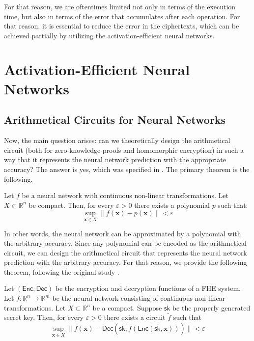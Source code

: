 \documentclass{iacrtrans}
\begin{document}
For that reason, we are oftentimes limited not only in terms of the execution
time, but also in terms of the error that accumulates after each operation. For
that reason, it is essential to reduce the error in the ciphertexts, which can
be achieved partially by utilizing the activation-efficient neural networks.

\section{Activation-Efficient Neural Networks}

\subsection{Arithmetical Circuits for Neural Networks}

Now, the main question arises: can we theoretically design the arithmetical 
circuit (both for zero-knowledge proofs and homomorphic encryption) in such a
way that it represents the neural network prediction with the appropriate 
accuracy? The answer is yes, which was specified in \cite{cryptonets}. 
The primary theorem is the following.

\begin{theorem}
    Let $f$ be a neural network with continuous non-linear transformations. Let
    $X \subset \mathbb{R}^n$ be compact. Then, for every $\varepsilon > 0$ there 
    exists a polynomial $p$ such that:
    \begin{equation*}
        \sup_{\mathbf{x} \in X}\|f(\mathbf{x}) - p(\mathbf{x})\| < \varepsilon
    \end{equation*}
\end{theorem}

In other words, the neural network can be approximated by a polynomial with the
arbitrary accuracy. Since any polynomial can be encoded as the arithmetical
circuit, we can design the arithmetical circuit that represents the neural
network prediction with the arbitrary accuracy. For that reason, we 
provide the following theorem, following the original study \cite{cryptonets}.

\begin{theorem}
    Let $(\mathsf{Enc}, \mathsf{Dec})$ be the encryption and decryption
    functions of a FHE system. Let $f: \mathbb{R}^n \to \mathbb{R}^m$ be the
    neural network consisting of continuous non-linear transformations. Let $X
    \subset \mathbb{R}^n$ be a compact. Suppose $\mathsf{sk}$ be the properly
    generated secret key. Then, for every $\varepsilon > 0$ there exists a
    circuit $\widetilde{f}$ such that
    \begin{equation*}
        \sup_{\mathbf{x} \in X}\|f(\mathbf{x}) - \mathsf{Dec}(\mathsf{sk}, \widetilde{f}(\mathsf{Enc}(\mathsf{sk},\mathbf{x})))\| < \varepsilon
    \end{equation*}
\end{theorem}
\end{document}
